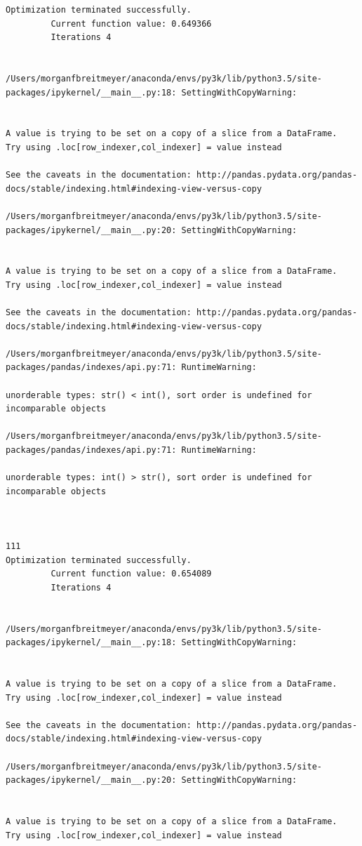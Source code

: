 \begin{lstlisting}
Optimization terminated successfully.
         Current function value: 0.649366
         Iterations 4


/Users/morganfbreitmeyer/anaconda/envs/py3k/lib/python3.5/site-packages/ipykernel/__main__.py:18: SettingWithCopyWarning:


A value is trying to be set on a copy of a slice from a DataFrame.
Try using .loc[row_indexer,col_indexer] = value instead

See the caveats in the documentation: http://pandas.pydata.org/pandas-docs/stable/indexing.html#indexing-view-versus-copy

/Users/morganfbreitmeyer/anaconda/envs/py3k/lib/python3.5/site-packages/ipykernel/__main__.py:20: SettingWithCopyWarning:


A value is trying to be set on a copy of a slice from a DataFrame.
Try using .loc[row_indexer,col_indexer] = value instead

See the caveats in the documentation: http://pandas.pydata.org/pandas-docs/stable/indexing.html#indexing-view-versus-copy

/Users/morganfbreitmeyer/anaconda/envs/py3k/lib/python3.5/site-packages/pandas/indexes/api.py:71: RuntimeWarning:

unorderable types: str() < int(), sort order is undefined for incomparable objects

/Users/morganfbreitmeyer/anaconda/envs/py3k/lib/python3.5/site-packages/pandas/indexes/api.py:71: RuntimeWarning:

unorderable types: int() > str(), sort order is undefined for incomparable objects



111
Optimization terminated successfully.
         Current function value: 0.654089
         Iterations 4


/Users/morganfbreitmeyer/anaconda/envs/py3k/lib/python3.5/site-packages/ipykernel/__main__.py:18: SettingWithCopyWarning:


A value is trying to be set on a copy of a slice from a DataFrame.
Try using .loc[row_indexer,col_indexer] = value instead

See the caveats in the documentation: http://pandas.pydata.org/pandas-docs/stable/indexing.html#indexing-view-versus-copy

/Users/morganfbreitmeyer/anaconda/envs/py3k/lib/python3.5/site-packages/ipykernel/__main__.py:20: SettingWithCopyWarning:


A value is trying to be set on a copy of a slice from a DataFrame.
Try using .loc[row_indexer,col_indexer] = value instead


\end{lstlisting}
